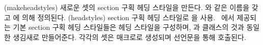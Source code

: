 \begin{syntax}
\cmd{\makeheadstyles} \\
\cmd{\headstyles} \\
\end{syntax}
\glossary(makeheadstyles)%
  {}%
  {새로운 셋의 section 구획 헤딩 스타일을 만든다.
  	와 같은 이름을 갖고 에 의해 정의된다.}
\glossary(headstyles)%
  {}%
    {section 구획 헤딩 스타일로 을 사용.}
\Mname\ 에서 제공되는 기본 section 구획 헤딩 스타일들은  헤딩 스타일을 구성하며,
과  클래스의 것과 동일한 생김새로 만들어준다.
각각의 셋은 \cmd{\makeheadstyles} 매크로로 생성되며  선언문을 통해 호출된다.
\begin{lcode}
\end{lcode}

